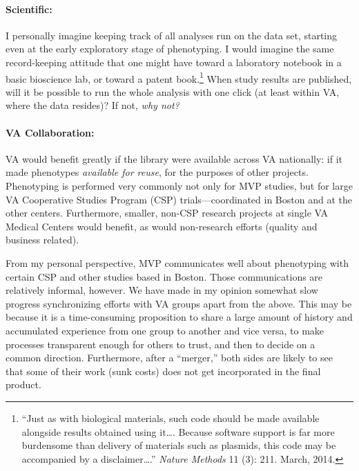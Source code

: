 \documentclass{tufte-handout}
\begin{document}
\paragraph{Scientific:}
I personally imagine keeping track of all analyses run on the data
set, starting even at the early exploratory stage of phenotyping. I
would imagine the same record-keeping attitude that one might have
toward a laboratory notebook in a basic bioscience lab, or toward a
patent book.\footnote{``Just as with biological materials, such code
  should be made available alongside results obtained using
  it\ldots{}. Because software support is far more burdensome than
  delivery of materials such as plasmids, this code may be accompanied
  by a disclaimer\ldots{}.'' \emph{Nature Methods} 11 (3): 211. March,
  2014.} When study results are published, will it be possible to run
the whole analysis with one click (at least within VA, where the data
resides)? If not, \emph{why not?}

\paragraph{VA Collaboration:}
VA would benefit greatly if the library were available across VA
nationally: if it made phenotypes \emph{available for reuse}, for the
purposes of other projects. Phenotyping is performed very commonly not
only for MVP studies, but for large VA Cooperative Studies Program
(CSP) trials---coordinated in Boston and at the other centers.
Furthermore, smaller, non-CSP research projects at single VA Medical
Centers would benefit, as would non-research efforts (quality and
business related).

From my personal perspective, MVP communicates well about phenotyping
with certain CSP and other studies based in Boston. Those
communications are relatively informal, however. We have made in my
opinion somewhat slow progress synchronizing efforts with VA groups
apart from the above. This may be because it is a time-consuming
proposition to share a large amount of history and accumulated
experience from one group to another and vice versa, to make processes
transparent enough for others to trust, and then to decide on a common
direction. Furthermore, after a ``merger,'' both sides are likely to
see that some of their work (sunk costs) does not get incorporated in
the final product.
\end{document}
